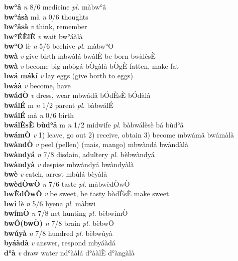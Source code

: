 \documentclass{article}
\begin{document}
{\bf bw°â}  {\it n} 8/6 medicine {\it pl.} màbw°â         \\ 
{\bf bw°ásà} mà {\it n} 0/6 thoughts         \\ 
{\bf bw°âsà}  {\it v} think, remember         \\ 
{\bf bw°ÉÈlÈ}  {\it v} wait      bw°áàlà   \\ 
{\bf bw°O} lè {\it n} 5/6 beehive {\it pl.} màbw°O         \\ 
{\bf bwà}  {\it v} give birth   mbwàlá bwàlÈ be born bwàlèsÈ    \\ 
{\bf bwà}  {\it v} become big   mbògá   bÒgàlà  bÒgÈ fatten, make fat \\ 
{\bf bwá mákí}  {\it v} lay eggs (give borth to eggs)         \\ 
{\bf bwàà}  {\it v} become, have         \\ 
{\bf bwádÒ}  {\it v} dress, wear   mbwádâ  bÓdÈsÈ bÓdàlà   \\ 
{\bf bwálÉ} m {\it n} 1/2 parent {\it pl.} bàbwálÉ         \\ 
{\bf bwálÉ} mà {\it n} 0/6 birth         \\ 
{\bf bwálÈsÈ bùd°â} m {\it n} 1/2 midwife {\it pl.} bàbwálèsè bá bùd°â         \\ 
{\bf bwámÒ}  {\it v} 1) leave, go out 2) receive, obtain 3) become   mbwámâ   bwámàlà   \\ 
{\bf bwàndÒ}  {\it v} peel (pellen) (mais, mango)   mbwàndá   bwàndàlà   \\ 
{\bf bwàndyá}  {\it n} 7/8 disdain, adultery {\it pl.} bèbwàndyá         \\ 
{\bf bwàndyà}  {\it v} despise   mbwàndyá   bwàndyàlà   \\ 
{\bf bwè}  {\it v} catch, arrest   mbùlá   bèyàlà   \\ 
{\bf bwèdÒwÒ}  {\it n} 7/6 taste {\it pl.} màbwèdÒwÒ         \\ 
{\bf bwÈdÒwÒ}  {\it v} be sweet, be tasty     bòdÈsÈ make sweet    \\ 
{\bf bwi} lè {\it n} 5/6 hyena {\it pl.} màbwi         \\ 
{\bf bwímÒ}  {\it n} 7/8 net hunting {\it pl.} bèbwímÒ         \\ 
{\bf bwÔ(bwÒ)}  {\it n} 7/8 brain {\it pl.} bèbwÔ         \\ 
{\bf bwúyà}  {\it n} 7/8 hundred {\it pl.} bèbwúyà         \\ 
{\bf byáàdà}  {\it v} answer, respond   mbyáàdá      \\ 
{\bf d°à}  {\it v} draw water   nd°ààlá d°ààlÈ  d°àngàlà   \\ 
\end{document}
